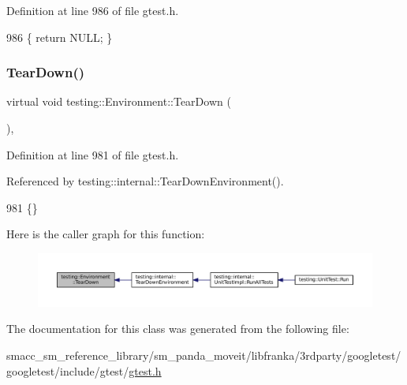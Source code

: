 Definition at line 986 of file gtest.\+h.


\begin{DoxyCode}
986 \{ \textcolor{keywordflow}{return} NULL; \}
\end{DoxyCode}
\mbox{\label{classtesting_1_1Environment_a039bdaa705c46b9b88234cf4d3bb6254}} 
\subsubsection{\texorpdfstring{Tear\+Down()}{TearDown()}}
{\footnotesize\ttfamily virtual void testing\+::\+Environment\+::\+Tear\+Down (\begin{DoxyParamCaption}{ }\end{DoxyParamCaption})\hspace{0.3cm}{\ttfamily [inline]}, {\ttfamily [virtual]}}



Definition at line 981 of file gtest.\+h.



Referenced by testing\+::internal\+::\+Tear\+Down\+Environment().


\begin{DoxyCode}
981 \{\}
\end{DoxyCode}
Here is the caller graph for this function\+:
\nopagebreak
\begin{figure}[H]
\begin{center}
\leavevmode
\includegraphics[width=350pt]{classtesting_1_1Environment_a039bdaa705c46b9b88234cf4d3bb6254_icgraph}
\end{center}
\end{figure}


The documentation for this class was generated from the following file\+:\begin{DoxyCompactItemize}
\item 
smacc\+\_\+sm\+\_\+reference\+\_\+library/sm\+\_\+panda\+\_\+moveit/libfranka/3rdparty/googletest/googletest/include/gtest/\hyperlink{gtest_8h}{gtest.\+h}\end{DoxyCompactItemize}
